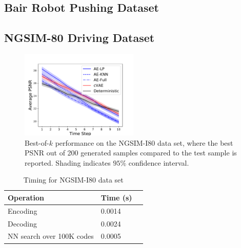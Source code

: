 \documentclass{article}
\begin{document}
\subsection{Bair Robot Pushing Dataset}




\subsection{NGSIM-80 Driving Dataset}




\begin{figure}
  \centering
  \includegraphics[width=0.5\textwidth]{images/best_of_k_i80.pdf}
  \caption{Best-of-$k$ performance on the NGSIM-I80 data set, where the best PSNR out of 200 generated samples compared to the test sample is reported. Shading indicates $95\%$ confidence interval. }
  \label{bair}
\end{figure}





\begin{table}
  \caption{Timing for NGSIM-I80 data set}
  \label{sample-table}
  \centering
  \begin{tabular}{lll}
    \toprule
    Operation     & Time (s) \\
    \midrule
    Encoding & 0.0014  \\
    Decoding     & 0.0024 \\
    NN search over 100K codes & 0.0005      \\
    \bottomrule
  \end{tabular}
\end{table}
\end{document}
